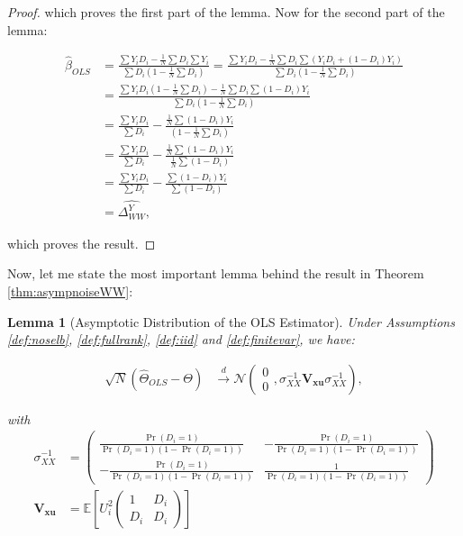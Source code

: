 \documentclass[
]{book}
\newcommand{\esp}[1]{\mathbb{E}[ #1 ]}
\newtheorem{lemma}{Lemma}[chapter]
\theoremstyle{definition}
\theoremstyle{definition}
\theoremstyle{definition}
\theoremstyle{definition}
\theoremstyle{remark}
\begin{document}
\begin{proof}
which proves the first part of the lemma.
Now for the second part of the lemma:

\begin{align*}
  \hat{\beta}_{OLS} &  = \frac{\sum Y_iD_i-\frac{1}{N}\sum D_i\sum Y_i}{\sum D_i\left(1-\frac{1}{N}\sum D_i\right)}
                       = \frac{\sum Y_iD_i-\frac{1}{N}\sum D_i\sum\left(Y_iD_i+(1-D_i)Y_i\right)}{\sum D_i\left(1-\frac{1}{N}\sum D_i\right)}\\
                    &  = \frac{\sum Y_iD_i\left(1-\frac{1}{N}\sum D_i\right)-\frac{1}{N}\sum D_i\sum(1-D_i)Y_i}{\sum D_i\left(1-\frac{1}{N}\sum D_i\right)}\\
                    &  = \frac{\sum Y_iD_i}{\sum D_i}-\frac{\frac{1}{N}\sum(1-D_i)Y_i}{\left(1-\frac{1}{N}\sum D_i\right)}\\
                    &  = \frac{\sum Y_iD_i}{\sum D_i}-\frac{\frac{1}{N}\sum(1-D_i)Y_i}{\frac{1}{N}\sum\left(1-D_i\right)}\\
                     &  = \frac{\sum Y_iD_i}{\sum D_i}-\frac{\sum(1-D_i)Y_i}{\sum\left(1-D_i\right)}\\
                     & = \hat{\Delta^Y_{WW}},
\end{align*}

which proves the result.
\end{proof}

Now, let me state the most important lemma behind the result in Theorem \ref{thm:asympnoiseWW}:

\begin{lemma}[Asymptotic Distribution of the OLS Estimator]
\protect\hypertarget{lem:asympOLS}{}{\label{lem:asympOLS} \iffalse (Asymptotic Distribution of the OLS Estimator) \fi{} }Under Assumptions \ref{def:noselb}, \ref{def:fullrank}, \ref{def:iid} and \ref{def:finitevar}, we have:

\begin{align*}
  \sqrt{N}(\hat{\Theta}_{OLS}-\Theta) &  \stackrel{d}{\rightarrow}
  \mathcal{N}\left(\begin{array}{c} 0\\ 0\end{array},
  \sigma_{XX}^{-1}\mathbf{V_{xu}}\sigma_{XX}^{-1}\right), 
\end{align*}

with
\begin{align*}
\sigma_{XX}^{-1}& = \left(\begin{array}{cc} \frac{\Pr(D_i=1)}{\Pr(D_i=1)(1-\Pr(D_i=1))} & -\frac{\Pr(D_i=1)}{\Pr(D_i=1)(1-\Pr(D_i=1))}\\
                                          -\frac{\Pr(D_i=1)}{\Pr(D_i=1)(1-\Pr(D_i=1))} & \frac{1}{\Pr(D_i=1)(1-\Pr(D_i=1))} 
                          \end{array}\right)\\
\mathbf{V_{xu}}&= \esp{U_i^2\left(\begin{array}{cc}  1 & D_i\\  D_i & D_i\end{array}\right)}                        
\end{align*}
\end{lemma}
\end{document}
